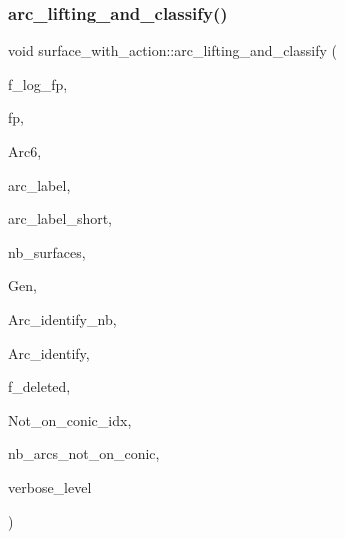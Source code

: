\subsubsection{\texorpdfstring{arc\+\_\+lifting\+\_\+and\+\_\+classify()}{arc\_lifting\_and\_classify()}}
{\footnotesize\ttfamily void surface\+\_\+with\+\_\+action\+::arc\+\_\+lifting\+\_\+and\+\_\+classify (\begin{DoxyParamCaption}\item[{\mbox{\hyperlink{galois_8h_a09fddde158a3a20bd2dcadb609de11dc}{I\+NT}}}]{f\+\_\+log\+\_\+fp,  }\item[{ofstream \&}]{fp,  }\item[{\mbox{\hyperlink{galois_8h_a09fddde158a3a20bd2dcadb609de11dc}{I\+NT}} $\ast$}]{Arc6,  }\item[{const \mbox{\hyperlink{galois_8h_ab6cc7b4aeb6ea31aba2b3fbfc83ff5e6}{B\+Y\+TE}} $\ast$}]{arc\+\_\+label,  }\item[{const \mbox{\hyperlink{galois_8h_ab6cc7b4aeb6ea31aba2b3fbfc83ff5e6}{B\+Y\+TE}} $\ast$}]{arc\+\_\+label\+\_\+short,  }\item[{\mbox{\hyperlink{galois_8h_a09fddde158a3a20bd2dcadb609de11dc}{I\+NT}}}]{nb\+\_\+surfaces,  }\item[{\mbox{\hyperlink{classarc__generator}{arc\+\_\+generator}} $\ast$}]{Gen,  }\item[{\mbox{\hyperlink{galois_8h_a09fddde158a3a20bd2dcadb609de11dc}{I\+NT}} $\ast$}]{Arc\+\_\+identify\+\_\+nb,  }\item[{\mbox{\hyperlink{galois_8h_a09fddde158a3a20bd2dcadb609de11dc}{I\+NT}} $\ast$}]{Arc\+\_\+identify,  }\item[{\mbox{\hyperlink{galois_8h_a09fddde158a3a20bd2dcadb609de11dc}{I\+NT}} $\ast$}]{f\+\_\+deleted,  }\item[{\mbox{\hyperlink{galois_8h_a09fddde158a3a20bd2dcadb609de11dc}{I\+NT}} $\ast$}]{Not\+\_\+on\+\_\+conic\+\_\+idx,  }\item[{\mbox{\hyperlink{galois_8h_a09fddde158a3a20bd2dcadb609de11dc}{I\+NT}}}]{nb\+\_\+arcs\+\_\+not\+\_\+on\+\_\+conic,  }\item[{\mbox{\hyperlink{galois_8h_a09fddde158a3a20bd2dcadb609de11dc}{I\+NT}}}]{verbose\+\_\+level }\end{DoxyParamCaption})}

\mbox{\label{classsurface__with__action_a870db90931112560e814493c70f768ab}} 
